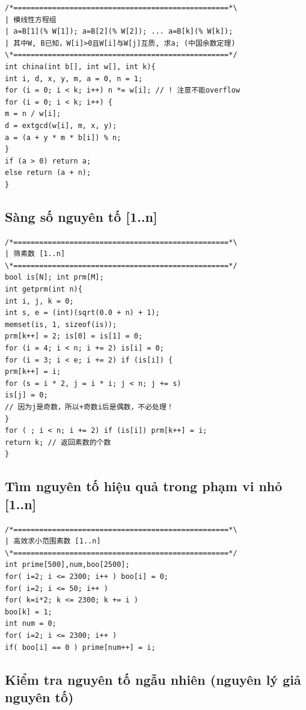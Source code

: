 \documentclass[11pt]{article}
\begin{document}
\begingroup
\scriptsize
\begin{verbatim}
/*==================================================*\
| 模线性方程组
| a=B[1](% W[1]); a=B[2](% W[2]); ... a=B[k](% W[k]);
| 其中W, B已知，W[i]>0且W[i]与W[j]互质, 求a; (中国余数定理)
\*==================================================*/
int china(int b[], int w[], int k){
int i, d, x, y, m, a = 0, n = 1;
for (i = 0; i < k; i++) n *= w[i]; // ! 注意不能overflow
for (i = 0; i < k; i++) {
m = n / w[i];
d = extgcd(w[i], m, x, y);
a = (a + y * m * b[i]) % n;
}
if (a > 0) return a;
else return (a + n);
}
\end{verbatim}
\endgroup

\subsection{Sàng số nguyên tố [1..n]}

\begingroup
\scriptsize
\begin{verbatim}
/*==================================================*\
| 筛素数 [1..n]
\*==================================================*/
bool is[N]; int prm[M];
int getprm(int n){
int i, j, k = 0;
int s, e = (int)(sqrt(0.0 + n) + 1);
memset(is, 1, sizeof(is));
prm[k++] = 2; is[0] = is[1] = 0;
for (i = 4; i < n; i += 2) is[i] = 0;
for (i = 3; i < e; i += 2) if (is[i]) {
prm[k++] = i;
for (s = i * 2, j = i * i; j < n; j += s)
is[j] = 0;
// 因为j是奇数，所以+奇数i后是偶数，不必处理！
}
for ( ; i < n; i += 2) if (is[i]) prm[k++] = i;
return k; // 返回素数的个数
}
\end{verbatim}
\endgroup

\subsection{Tìm nguyên tố hiệu quả trong phạm vi nhỏ [1..n]}

\begingroup
\scriptsize
\begin{verbatim}
/*==================================================*\
| 高效求小范围素数 [1..n]
\*==================================================*/
int prime[500],num,boo[2500];
for( i=2; i <= 2300; i++ ) boo[i] = 0;
for( i=2; i <= 50; i++ )
for( k=i*2; k <= 2300; k += i )
boo[k] = 1;
int num = 0;
for( i=2; i <= 2300; i++ )
if( boo[i] == 0 ) prime[num++] = i;
\end{verbatim}
\endgroup

\subsection{Kiểm tra nguyên tố ngẫu nhiên (nguyên lý giả nguyên tố)}
\end{document}
